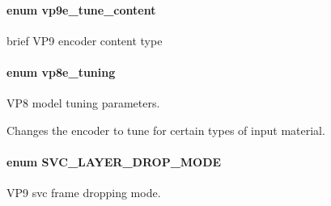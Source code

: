 \paragraph[{\texorpdfstring{vp9e\+\_\+tune\+\_\+content}{vp9e_tune_content}}]{\setlength{\rightskip}{0pt plus 5cm}enum {\bf vp9e\+\_\+tune\+\_\+content}}\hypertarget{group__vp8__encoder_ga76d4298d5ee58718597f307a290211a9}{}\label{group__vp8__encoder_ga76d4298d5ee58718597f307a290211a9}
brief V\+P9 encoder content type 
\paragraph[{\texorpdfstring{vp8e\+\_\+tuning}{vp8e_tuning}}]{\setlength{\rightskip}{0pt plus 5cm}enum {\bf vp8e\+\_\+tuning}}\hypertarget{group__vp8__encoder_ga371dbc29054b3d46364af996ad42ab94}{}\label{group__vp8__encoder_ga371dbc29054b3d46364af996ad42ab94}


V\+P8 model tuning parameters. 

Changes the encoder to tune for certain types of input material. 
\paragraph[{\texorpdfstring{S\+V\+C\+\_\+\+L\+A\+Y\+E\+R\+\_\+\+D\+R\+O\+P\+\_\+\+M\+O\+DE}{SVC_LAYER_DROP_MODE}}]{\setlength{\rightskip}{0pt plus 5cm}enum {\bf S\+V\+C\+\_\+\+L\+A\+Y\+E\+R\+\_\+\+D\+R\+O\+P\+\_\+\+M\+O\+DE}}\hypertarget{group__vp8__encoder_ga3205681fab504015432ce09e6e3fdce4}{}\label{group__vp8__encoder_ga3205681fab504015432ce09e6e3fdce4}


V\+P9 svc frame dropping mode. 

